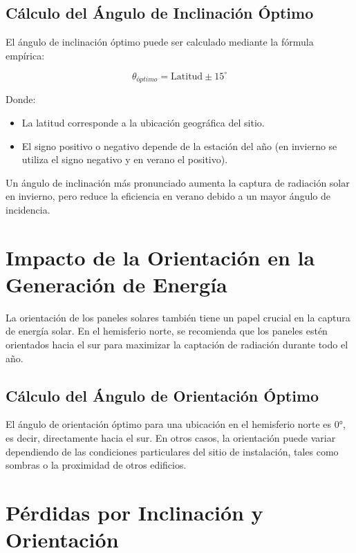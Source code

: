 \documentclass[a4paper,12pt]{article}
\begin{document}
\subsection{Cálculo del Ángulo de Inclinación Óptimo}

El ángulo de inclinación óptimo puede ser calculado mediante la fórmula empírica:

\begin{equation}
    \theta_{óptimo} = \text{Latitud} \pm 15^\circ
\end{equation}

Donde:
\begin{itemize}
    \item La latitud corresponde a la ubicación geográfica del sitio.
    \item El signo positivo o negativo depende de la estación del año (en invierno se utiliza el signo negativo y en verano el positivo).
\end{itemize}

Un ángulo de inclinación más pronunciado aumenta la captura de radiación solar en invierno, pero reduce la eficiencia en verano debido a un mayor ángulo de incidencia.

\section{Impacto de la Orientación en la Generación de Energía}

La orientación de los paneles solares también tiene un papel crucial en la captura de energía solar. En el hemisferio norte, se recomienda que los paneles estén orientados hacia el sur para maximizar la captación de radiación durante todo el año.

\subsection{Cálculo del Ángulo de Orientación Óptimo}

El ángulo de orientación óptimo para una ubicación en el hemisferio norte es 0°, es decir, directamente hacia el sur. En otros casos, la orientación puede variar dependiendo de las condiciones particulares del sitio de instalación, tales como sombras o la proximidad de otros edificios.

\section{Pérdidas por Inclinación y Orientación}
\end{document}
